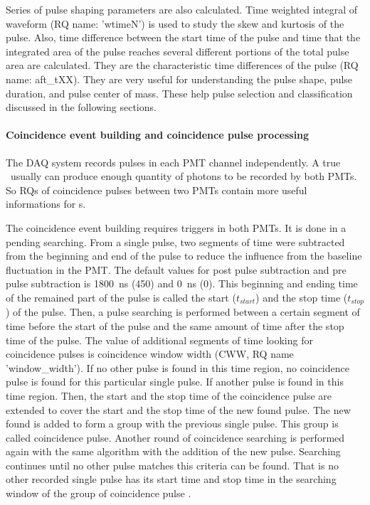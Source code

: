 Series of pulse shaping parameters are also calculated. Time weighted integral of waveform (RQ name: 'wtimeN') is used to study the skew and kurtosis of the pulse. Also, time difference between the start time of the pulse and time that the integrated area of the pulse reaches several different portions of the total pulse area are calculated. They are the characteristic time differences of the pulse (RQ name: aft\_tXX). They are very useful for understanding the pulse shape, pulse duration, and pulse center of mass. These help pulse selection and classification discussed in the following sections. 

\paragraph{Coincidence event building and coincidence pulse processing}  \label{par:coinbuild}
The DAQ system records pulses in each PMT channel independently. A true \eep\ usually can produce enough quantity of photons to be recorded by both PMTs. So RQs of coincidence pulses between two PMTs contain more useful informations for \eep s. 

The coincidence event building requires triggers in both PMTs. It is done in a pending searching. From a single pulse, two segments of time were subtracted from the beginning and end of the pulse to reduce the influence from the baseline fluctuation in the PMT. The default values for post pulse subtraction and pre pulse subtraction is \SI{1800}{\ns} (\SI{450}{\sample}) and \SI{0}{\ns} (\SI{0}{\sample}). This beginning and ending time of the remained part of the pulse is called the start ($t_{start}$) and the stop time ($t_{stop}$) of the pulse. Then, a pulse searching is performed between a certain segment of time before the start of the pulse and the same amount of time after the stop time of the pulse. The value of additional segments of time looking for coincidence pulses is coincidence window width (CWW, RQ name 'window\_width'). If no other pulse is found in this time region, no coincidence pulse is found for this particular single pulse. If another pulse is found in this time region. Then, the start and the stop time of the coincidence pulse are extended to cover the start and the stop time of the new found pulse. The new found is added to form a group with the previous single pulse. This group is called coincidence pulse. Another round of coincidence searching is performed again with the same algorithm with the addition of the new pulse. Searching continues until no other pulse matches this criteria can be found. That is no other recorded single pulse has its start time and stop time in the searching window of the group of coincidence pulse .

